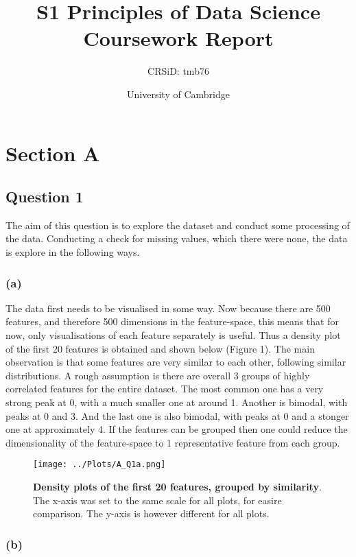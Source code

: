 \documentclass[12pt]{report} %
\title{S1 Principles of Data Science Coursework Report}
\author{CRSiD: tmb76}
\date{University of Cambridge}
\begin{document}
 

\maketitle

\chapter*{Section A}

\section*{Question 1}

The aim of this question is to explore the dataset and conduct some processing of the data. Conducting a check for missing values, which there were none, the data is explore in the following ways.

\subsection*{(a)}

The data first needs to be visualised in some way. Now because there are 500 features, and therefore 500 dimensions in the feature-space, this means that for now, only visualisations of each feature separately is useful. Thus a density plot of the first 20 features is obtained and shown below (Figure 1).  The main observation is that some features are very similar to each other, following similar distributions. A rough assumption is there are overall 3 groups of highly correlated features for the entire dataset. The most common one has a very strong peak at 0, with a much smaller one at around 1. Another is bimodal, with peaks at 0 and 3. And the last one is also bimodal, with peaks at 0 and a stonger one at approximately 4. If the features can be grouped then one could reduce the dimensionality of the feature-space to 1 representative feature from each group.

\begin{figure}[hp]
    \centering
    \texttt{[image: ../Plots/A\_Q1a.png]}
    \caption{ \textbf{Density plots of the first 20 features, grouped by similarity}. The x-axis was set to the same scale for all plots, for easire comparison. The y-axis is however different for all plots.}
\end{figure}

\newpage

\subsection*{(b)}
\end{document}
